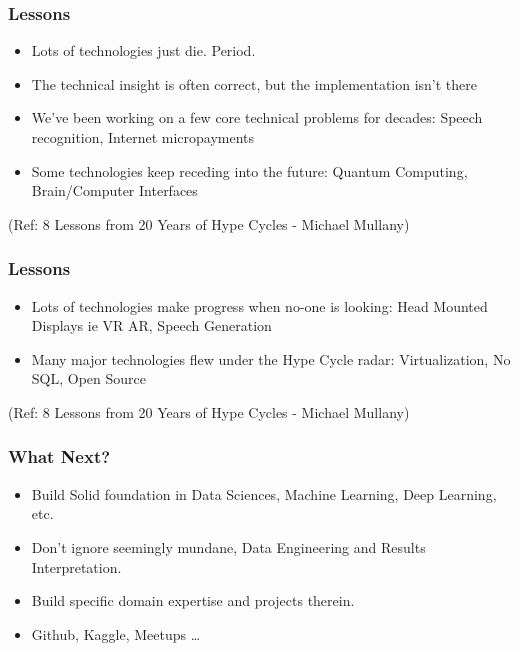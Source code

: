 \begin{frame}[fragile]\frametitle{Lessons}


\begin{itemize}
\item  Lots of technologies just die. Period. 
\item The technical insight is often correct, but the implementation isn't there
\item We've been working on a few core technical problems for decades: Speech recognition, Internet micropayments
\item Some technologies keep receding into the future: Quantum Computing, Brain/Computer Interfaces
\end{itemize}


{\tiny (Ref: 8 Lessons from 20 Years of Hype Cycles - Michael Mullany)}

\end{frame}

\begin{frame}[fragile]\frametitle{Lessons}


\begin{itemize}
\item Lots of technologies make progress when no-one is looking: Head Mounted Displays ie VR AR, Speech Generation
\item  Many major technologies flew under the Hype Cycle radar: Virtualization, No SQL, Open Source
\end{itemize}


{\tiny (Ref: 8 Lessons from 20 Years of Hype Cycles - Michael Mullany)}

\end{frame}


\begin{frame}[fragile]\frametitle{What Next?}


\begin{itemize}
\item Build Solid foundation in Data Sciences, Machine Learning, Deep Learning, etc.
\item Don't ignore seemingly mundane, Data Engineering and Results Interpretation.
\item Build specific domain expertise and projects therein.
\item Github, Kaggle, Meetups \ldots
\end{itemize}

\end{frame}


